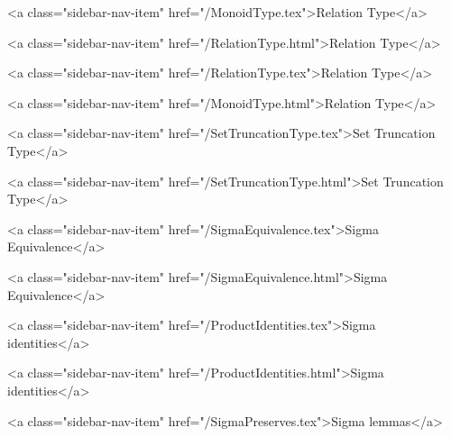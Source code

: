       
    
      
        
          <a class="sidebar-nav-item" href="/MonoidType.tex">Relation Type</a>
        
      
    
      
        
          <a class="sidebar-nav-item" href="/RelationType.html">Relation Type</a>
        
      
    
      
        
          <a class="sidebar-nav-item" href="/RelationType.tex">Relation Type</a>
        
      
    
      
        
          <a class="sidebar-nav-item" href="/MonoidType.html">Relation Type</a>
        
      
    
      
        
          <a class="sidebar-nav-item" href="/SetTruncationType.tex">Set Truncation Type</a>
        
      
    
      
        
          <a class="sidebar-nav-item" href="/SetTruncationType.html">Set Truncation Type</a>
        
      
    
      
        
          <a class="sidebar-nav-item" href="/SigmaEquivalence.tex">Sigma Equivalence</a>
        
      
    
      
        
          <a class="sidebar-nav-item" href="/SigmaEquivalence.html">Sigma Equivalence</a>
        
      
    
      
        
          <a class="sidebar-nav-item" href="/ProductIdentities.tex">Sigma identities</a>
        
      
    
      
        
          <a class="sidebar-nav-item" href="/ProductIdentities.html">Sigma identities</a>
        
      
    
      
        
          <a class="sidebar-nav-item" href="/SigmaPreserves.tex">Sigma lemmas</a>
        
